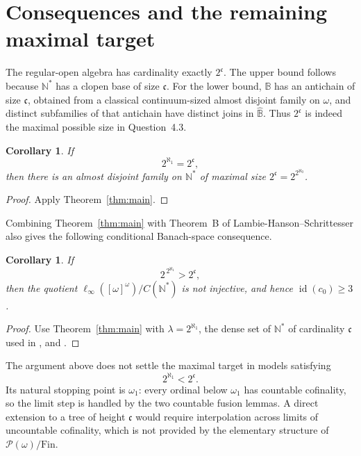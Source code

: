 \documentclass[11pt]{article}
\newtheorem{corollary}[theorem]{Corollary}
\theoremstyle{definition}
\theoremstyle{remark}
\newcommand{\B}{\mathbb B}
\newcommand{\wideB}{\widehat{\mathbb B}}
\newcommand{\Fin}{\mathrm{Fin}}
\begin{document}
\section{Consequences and the remaining maximal target}

The regular-open algebra has cardinality exactly \(2^{\mathfrak c}\).  The
upper bound follows because \(\mathbb N^*\) has a clopen base of size
\(\mathfrak c\).  For the lower bound, \(\B\) has an antichain of size
\(\mathfrak c\), obtained from a classical continuum-sized almost disjoint
family on \(\omega\), and distinct subfamilies of that antichain have distinct
joins in \(\wideB\).  Thus \(2^{\mathfrak c}\) is indeed the maximal possible
size in Question~4.3.

\begin{corollary}\label{cor:maximal-equality}
If
\[
  2^{\aleph_1}=2^{\mathfrak c},
\]
then there is an almost disjoint family on \(\mathbb N^*\) of maximal size
\(2^{\mathfrak c}=2^{2^{\aleph_0}}\).
\end{corollary}

\begin{proof}
Apply Theorem~\ref{thm:main}.
\end{proof}

Combining Theorem~\ref{thm:main} with Theorem~B of
Lambie-Hanson--Schrittesser also gives the following conditional Banach-space
consequence.

\begin{corollary}\label{cor:banach}
If
\[
  2^{\,2^{\aleph_1}}>2^{\mathfrak c},
\]
then the quotient
\(\ell_\infty([\omega]^\omega)/C(\mathbb N^*)\) is not injective, and hence
\(\operatorname{id}(c_0)\geq3\).
\end{corollary}

\begin{proof}
Use Theorem~\ref{thm:main} with
\(\lambda=2^{\aleph_1}\), the dense set of \(\mathbb N^*\) of cardinality
\(\mathfrak c\) used in \cite{LHS}, and \cite[Theorem~B]{LHS}.
\end{proof}

The argument above does not settle the maximal target in models satisfying
\[
  2^{\aleph_1}<2^{\mathfrak c}.
\]
Its natural stopping point is \(\omega_1\): every ordinal below \(\omega_1\)
has countable cofinality, so the limit step is handled by the two countable
fusion lemmas.  A direct extension to a tree of height \(\mathfrak c\) would
require interpolation across limits of uncountable cofinality, which is not
provided by the elementary structure of \(\mathcal P(\omega)/\Fin\).
\end{document}

